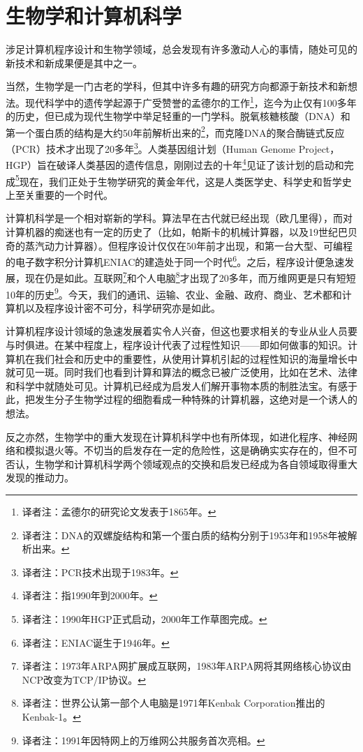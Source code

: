 \chapter{生物学和计算机科学}
\label{chap:chapter1}
\minitoc

涉足计算机程序设计和生物学领域，总会发现有许多激动人心的事情，随处可见的新技术和新成果便是其中之一。

当然，生物学是一门古老的学科，但其中许多有趣的研究方向都源于新技术和新想法。现代科学中的遗传学起源于广受赞誉的孟德尔的工作\footnote{译者注：孟德尔的研究论文发表于1865年。}，迄今为止仅有100多年的历史，但已成为现代生物学中举足轻重的一门学科。脱氧核糖核酸（DNA）和第一个蛋白质的结构是大约50年前解析出来的\footnote{译者注：DNA的双螺旋结构和第一个蛋白质的结构分别于1953年和1958年被解析出来。}，而克隆DNA的聚合酶链式反应（PCR）技术才出现了20多年\footnote{译者注：PCR技术出现于1983年。}。人类基因组计划（Human Genome Project，HGP）旨在破译人类基因的遗传信息，刚刚过去的十年\footnote{译者注：指1990年到2000年。}见证了该计划的启动和完成\footnote{译者注：1990年HGP正式启动，2000年工作草图完成。}现在，我们正处于生物学研究的黄金年代，这是人类医学史、科学史和哲学史上至关重要的一个时代。

计算机科学是一个相对崭新的学科。算法早在古代就已经出现（欧几里得），而对计算机器的痴迷也有一定的历史了（比如，帕斯卡的机械计算器，以及19世纪巴贝奇的蒸汽动力计算器）。但程序设计仅仅在50年前才出现，和第一台大型、可编程的电子数字积分计算机ENIAC的建造处于同一个时代\footnote{译者注：ENIAC诞生于1946年。}。之后，程序设计便急速发展，现在仍是如此。互联网\footnote{译者注：1973年ARPA网扩展成互联网，1983年ARPA网将其网络核心协议由NCP改变为TCP/IP协议。}和个人电脑\footnote{译者注：世界公认第一部个人电脑是1971年Kenbak Corporation推出的Kenbak-1。}才出现了20多年，而万维网更是只有短短10年的历史\footnote{译者注：1991年因特网上的万维网公共服务首次亮相。}。今天，我们的通讯、运输、农业、金融、政府、商业、艺术都和计算机以及程序设计密不可分，科学研究亦是如此。

计算机程序设计领域的急速发展着实令人兴奋，但这也要求相关的专业从业人员要与时俱进。在某中程度上，程序设计代表了过程性知识——即如何做事的知识。计算机在我们社会和历史中的重要性，从使用计算机引起的过程性知识的海量增长中就可见一斑。同时我们也看到计算和算法的概念已被广泛使用，比如在艺术、法律和科学中就随处可见。计算机已经成为启发人们解开事物本质的制胜法宝。有感于此，把发生分子生物学过程的细胞看成一种特殊的计算机器，这绝对是一个诱人的想法。

反之亦然，生物学中的重大发现在计算机科学中也有所体现，如进化程序、神经网络和模拟退火等。不切当的启发存在一定的危险性，这是确确实实存在的，但不可否认，生物学和计算机科学两个领域观点的交换和启发已经成为各自领域取得重大发现的推动力。

